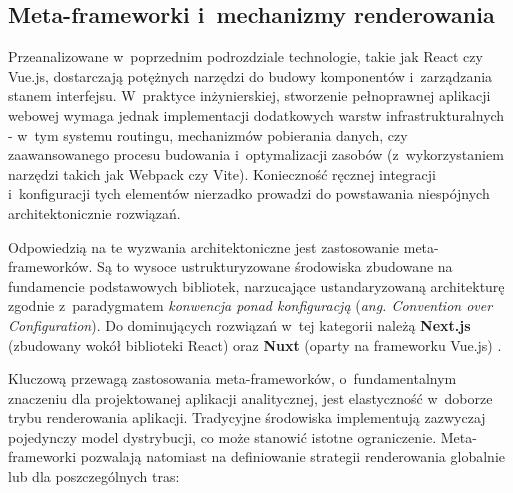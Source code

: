 \subsection{Meta-frameworki i~mechanizmy renderowania}
\label{subsec:meta-frameworki-i-mechanizmy-renderowania}

Przeanalizowane w~poprzednim podrozdziale technologie, takie jak React czy Vue.js, dostarczają potężnych narzędzi do budowy komponentów i~zarządzania stanem interfejsu.
W~praktyce inżynierskiej, stworzenie pełnoprawnej aplikacji webowej wymaga jednak implementacji dodatkowych warstw infrastrukturalnych - w~tym systemu routingu, mechanizmów pobierania danych, czy zaawansowanego procesu budowania i~optymalizacji zasobów (z~wykorzystaniem narzędzi takich jak Webpack czy Vite).
Konieczność ręcznej integracji i~konfiguracji tych elementów nierzadko prowadzi do powstawania niespójnych architektonicznie rozwiązań.

Odpowiedzią na te wyzwania architektoniczne jest zastosowanie meta-frameworków.
Są to wysoce ustrukturyzowane środowiska zbudowane na fundamencie podstawowych bibliotek, narzucające ustandaryzowaną architekturę zgodnie z~paradygmatem \textit{konwencja ponad konfiguracją} (\textit{ang. Convention over Configuration}).
Do dominujących rozwiązań w~tej kategorii należą \textbf{Next.js} (zbudowany wokół biblioteki React) \cite{nextjs_what_is_nextjs} oraz \textbf{Nuxt} (oparty na frameworku Vue.js) \cite{nuxt_introduction}.

Kluczową przewagą zastosowania meta-frameworków, o~fundamentalnym znaczeniu dla projektowanej aplikacji analitycznej, jest elastyczność w~doborze trybu renderowania aplikacji.
Tradycyjne środowiska implementują zazwyczaj pojedynczy model dystrybucji, co może stanowić istotne ograniczenie.
Meta-frameworki pozwalają natomiast na definiowanie strategii renderowania globalnie lub dla poszczególnych tras:

